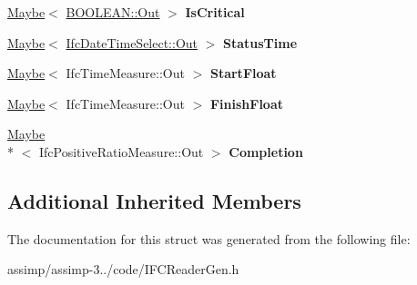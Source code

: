 \begin{DoxyCompactItemize}
\item 
\hypertarget{struct_assimp_1_1_i_f_c_1_1_ifc_schedule_time_control_a119b2b2039bec9dd48676309334722f8}{\hyperlink{struct_assimp_1_1_s_t_e_p_1_1_maybe}{Maybe}$<$ \hyperlink{classboost_1_1shared__ptr}{B\+O\+O\+L\+E\+A\+N\+::\+Out} $>$ {\bfseries Is\+Critical}}\label{struct_assimp_1_1_i_f_c_1_1_ifc_schedule_time_control_a119b2b2039bec9dd48676309334722f8}

\item 
\hypertarget{struct_assimp_1_1_i_f_c_1_1_ifc_schedule_time_control_a8490f36449f7ce9a8ef5e0e24ca0bf28}{\hyperlink{struct_assimp_1_1_s_t_e_p_1_1_maybe}{Maybe}$<$ \hyperlink{classboost_1_1shared__ptr}{Ifc\+Date\+Time\+Select\+::\+Out} $>$ {\bfseries Status\+Time}}\label{struct_assimp_1_1_i_f_c_1_1_ifc_schedule_time_control_a8490f36449f7ce9a8ef5e0e24ca0bf28}

\item 
\hypertarget{struct_assimp_1_1_i_f_c_1_1_ifc_schedule_time_control_a233cdbd535dd5a17f870f0b914c244f5}{\hyperlink{struct_assimp_1_1_s_t_e_p_1_1_maybe}{Maybe}$<$ Ifc\+Time\+Measure\+::\+Out $>$ {\bfseries Start\+Float}}\label{struct_assimp_1_1_i_f_c_1_1_ifc_schedule_time_control_a233cdbd535dd5a17f870f0b914c244f5}

\item 
\hypertarget{struct_assimp_1_1_i_f_c_1_1_ifc_schedule_time_control_a543a070a6050d39e5f7d8c242f01919f}{\hyperlink{struct_assimp_1_1_s_t_e_p_1_1_maybe}{Maybe}$<$ Ifc\+Time\+Measure\+::\+Out $>$ {\bfseries Finish\+Float}}\label{struct_assimp_1_1_i_f_c_1_1_ifc_schedule_time_control_a543a070a6050d39e5f7d8c242f01919f}

\item 
\hypertarget{struct_assimp_1_1_i_f_c_1_1_ifc_schedule_time_control_a6e0ab9dea4796e8766920dcd7de07cce}{\hyperlink{struct_assimp_1_1_s_t_e_p_1_1_maybe}{Maybe}\\*
$<$ Ifc\+Positive\+Ratio\+Measure\+::\+Out $>$ {\bfseries Completion}}\label{struct_assimp_1_1_i_f_c_1_1_ifc_schedule_time_control_a6e0ab9dea4796e8766920dcd7de07cce}

\end{DoxyCompactItemize}
\subsection*{Additional Inherited Members}


The documentation for this struct was generated from the following file\+:\begin{DoxyCompactItemize}
\item 
assimp/assimp-\/3../code/I\+F\+C\+Reader\+Gen.\+h\end{DoxyCompactItemize}
